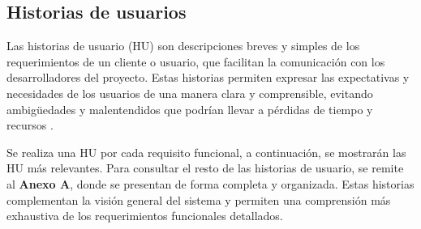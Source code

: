 \subsection{Historias de usuarios}

Las historias de usuario (HU) son descripciones breves y simples de los requerimientos de un cliente o usuario, que facilitan la comunicación con los desarrolladores del proyecto. Estas historias permiten expresar las expectativas y necesidades de los usuarios de una manera clara y comprensible, evitando ambigüedades y malentendidos que podrían llevar a pérdidas de tiempo y recursos \cite{menzinsky2018historias}.

Se realiza una HU por cada requisito funcional, a continuación, se mostrarán las HU más relevantes. Para consultar el resto de las historias de usuario, se remite al \textbf{Anexo A}, donde se presentan de forma completa y organizada. Estas historias complementan la visión general del sistema y permiten una comprensión más exhaustiva de los requerimientos funcionales detallados.


